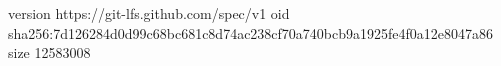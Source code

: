 version https://git-lfs.github.com/spec/v1
oid sha256:7d126284d0d99c68bc681c8d74ac238cf70a740bcb9a1925fe4f0a12e8047a86
size 12583008
